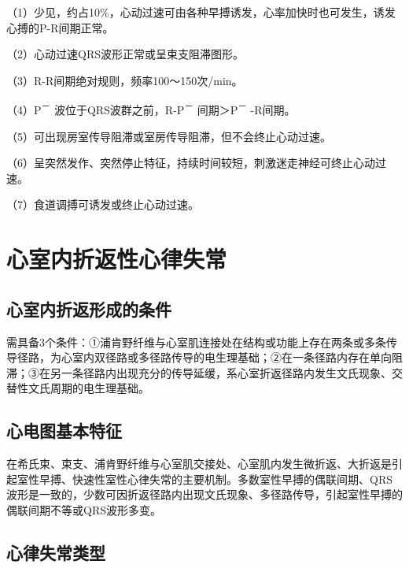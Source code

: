 （1）少见，约占10\%，心动过速可由各种早搏诱发，心率加快时也可发生，诱发心搏的P-R间期正常。

（2）心动过速QRS波形正常或呈束支阻滞图形。

（3）R-R间期绝对规则，频率100～150次/min。

（4）P\textsuperscript{－} 波位于QRS波群之前，R-P\textsuperscript{－}
间期＞P\textsuperscript{－} -R间期。

（5）可出现房室传导阻滞或室房传导阻滞，但不会终止心动过速。

（6）呈突然发作、突然停止特征，持续时间较短，刺激迷走神经可终止心动过速。

（7）食道调搏可诱发或终止心动过速。

\protect\hypertarget{text00021.htmlux5cux23subid240}{}{}

\section{心室内折返性心律失常}

\protect\hypertarget{text00021.htmlux5cux23subid241}{}{}

\subsection{心室内折返形成的条件}

需具备3个条件：①浦肯野纤维与心室肌连接处在结构或功能上存在两条或多条传导径路，为心室内双径路或多径路传导的电生理基础；②在一条径路内存在单向阻滞；③在另一条径路内出现充分的传导延缓，系心室折返径路内发生文氏现象、交替性文氏周期的电生理基础。

\protect\hypertarget{text00021.htmlux5cux23subid242}{}{}

\subsection{心电图基本特征}

在希氏束、束支、浦肯野纤维与心室肌交接处、心室肌内发生微折返、大折返是引起室性早搏、快速性室性心律失常的主要机制。多数室性早搏的偶联间期、QRS波形是一致的，少数可因折返径路内出现文氏现象、多径路传导，引起室性早搏的偶联间期不等或QRS波形多变。

\protect\hypertarget{text00021.htmlux5cux23subid243}{}{}

\subsection{心律失常类型}

